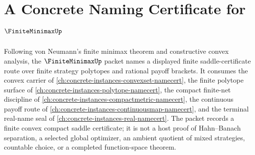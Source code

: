 \chapter{A Concrete Naming Certificate for $\FiniteMinimaxUp$}
\label{ch:concrete-instances-finite-minimax-namecert}

Following von Neumann's finite minimax theorem and constructive convex analysis, the $\FiniteMinimaxUp$ packet names a displayed finite saddle-certificate route over finite strategy polytopes and rational payoff brackets. It consumes the convex carrier of \autoref{ch:concrete-instances-convexset-namecert}, the finite polytope surface of \autoref{ch:concrete-instances-polytope-namecert}, the compact finite-net discipline of \autoref{ch:concrete-instances-compactmetric-namecert}, the continuous payoff route of \autoref{ch:concrete-instances-continuousmap-namecert}, and the terminal real-name seal of \autoref{ch:concrete-instances-real-namecert}. The packet records a finite convex compact saddle certificate; it is not a host proof of Hahn--Banach separation, a selected global optimizer, an ambient quotient of mixed strategies, countable choice, or a completed function-space theorem.

